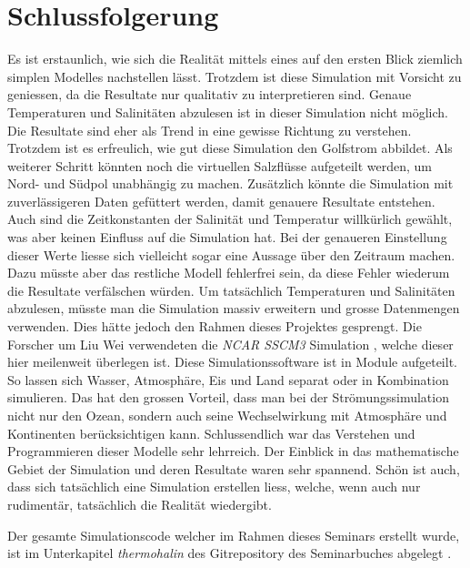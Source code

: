\section{Schlussfolgerung}

Es ist erstaunlich, wie sich die Realität mittels eines auf den ersten Blick ziemlich simplen Modelles nachstellen lässt. Trotzdem ist diese Simulation mit Vorsicht zu geniessen, da die Resultate nur qualitativ zu interpretieren sind. Genaue Temperaturen und Salinitäten abzulesen ist in dieser Simulation nicht möglich. Die Resultate sind eher als Trend in eine gewisse Richtung zu verstehen. Trotzdem ist es erfreulich, wie gut diese Simulation den Golfstrom abbildet. 
Als weiterer Schritt könnten noch die virtuellen Salzflüsse aufgeteilt werden, um Nord- und Südpol unabhängig zu machen. Zusätzlich könnte die Simulation mit zuverlässigeren Daten gefüttert werden, damit genauere Resultate entstehen. Auch sind die Zeitkonstanten der Salinität und Temperatur willkürlich gewählt, was aber keinen Einfluss auf die Simulation hat. Bei der genaueren Einstellung dieser Werte liesse sich vielleicht sogar eine Aussage über den Zeitraum machen. Dazu müsste aber das restliche Modell fehlerfrei sein, da diese Fehler wiederum die Resultate verfälschen würden.
Um tatsächlich Temperaturen und Salinitäten abzulesen, müsste man die Simulation massiv erweitern und grosse Datenmengen verwenden. Dies hätte jedoch den Rahmen dieses Projektes gesprengt. 
Die Forscher um Liu Wei \cite{thermohalin:liuwei} verwendeten die {\em NCAR SSCM3}
Simulation
\cite{thermohalin:sim},
welche dieser hier meilenweit überlegen ist. Diese Simulationssoftware ist in Module aufgeteilt. So lassen sich Wasser, Atmosphäre, Eis und Land separat oder in Kombination simulieren. Das hat den grossen Vorteil, dass man bei der Strömungssimulation nicht nur den Ozean, sondern auch seine Wechselwirkung mit Atmosphäre und Kontinenten berücksichtigen kann. 
Schlussendlich war das Verstehen und Programmieren dieser Modelle sehr lehrreich. Der Einblick in das mathematische Gebiet der Simulation und deren Resultate waren sehr spannend. Schön ist auch, dass sich tatsächlich eine Simulation erstellen liess, welche, wenn auch nur rudimentär, tatsächlich die Realität wiedergibt.

Der gesamte Simulationscode welcher im Rahmen dieses Seminars erstellt wurde, ist im Unterkapitel {\em thermohalin} des Gitrepository des Seminarbuches abgelegt \cite{thermohalin:gitrepo-klimawandel}.
